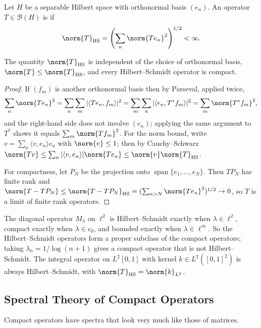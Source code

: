 \documentclass[a4paper]{scrartcl}
\newcommand{\ip}[2]{\langle #1, #2 \rangle}
\newcommand{\spn}{\operatorname{span}}
\newcommand{\Bop}{\mathcal{B}}
\begin{document}
\begin{definition}
	Let $H$ be a separable Hilbert space with orthonormal basis $(e_n)$. An operator $T \in \Bop(H)$ is  if
	$$\norm{T}_{\mathrm{HS}} = \left( \sum_n \norm{Te_n}^2 \right)^{1/2} < \infty.$$
\end{definition}

\begin{proposition}
	The quantity $\norm{T}_{\mathrm{HS}}$ is independent of the choice of orthonormal basis, $\norm{T}\leq\norm{T}_{\mathrm{HS}}$, and every Hilbert--Schmidt operator is compact.
\end{proposition}

\begin{proof}
	If $(f_m)$ is another orthonormal basis then by Parseval, applied twice,
	$$\sum_n \norm{Te_n}^2 = \sum_n\sum_m|\ip{Te_n}{f_m}|^2 = \sum_m\sum_n|\ip{e_n}{T^*f_m}|^2 = \sum_m\norm{T^*f_m}^2,$$
	and the right-hand side does not involve $(e_n)$; applying the same argument to $T^*$ shows it equals $\sum_m\norm{Tf_m}^2$. For the norm bound, write $v = \sum_n\ip{v}{e_n}e_n$ with $\norm{v}\leq1$; then by Cauchy--Schwarz $\norm{Tv}\leq\sum_n|\ip{v}{e_n}|\norm{Te_n}\leq\norm{v}\norm{T}_{\mathrm{HS}}$.

	For compactness, let $P_N$ be the projection onto $\spn\{e_1,\dots,e_N\}$. Then $TP_N$ has finite rank and $\norm{T - TP_N}\leq\norm{T-TP_N}_{\mathrm{HS}} = (\sum_{n>N}\norm{Te_n}^2)^{1/2}\to0$, so $T$ is a limit of finite rank operators.
\end{proof}

\begin{example}
	The diagonal operator $M_\lambda$ on $\ell^2$ is Hilbert--Schmidt exactly when $\lambda \in \ell^2$, compact exactly when $\lambda\in c_0$, and bounded exactly when $\lambda\in\ell^\infty$. So the Hilbert--Schmidt operators form a proper subclass of the compact operators; taking $\lambda_n = 1/\log(n+1)$ gives a compact operator that is not Hilbert--Schmidt. The integral operator on $L^2[0,1]$ with kernel $k \in L^2([0,1]^2)$ is always Hilbert--Schmidt, with $\norm{T}_{\mathrm{HS}}=\norm{k}_{L^2}$.
\end{example}

\subsection{Spectral Theory of Compact Operators}

Compact operators have spectra that look very much like those of matrices.
\end{document}
